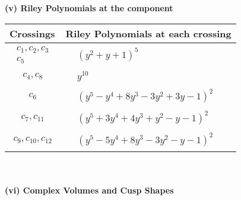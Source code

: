 \documentclass[1p]{elsarticle_modified}
\theoremstyle{definition}
\begin{document}
\newpage\renewcommand{\arraystretch}{1}
\flushleft \textbf{(v) Riley Polynomials at the component}\newline \\
\begin{tabular}{m{50pt}|m{274pt}}
Crossings & \hspace{64pt}Riley Polynomials at each crossing \\
\hline $$\begin{aligned}c_{1},c_{2},c_{3}\\c_{5}\end{aligned}$$&$\begin{aligned}
&(y^2+y+1)^5
\end{aligned}$\\
\hline $$\begin{aligned}c_{4},c_{8}\end{aligned}$$&$\begin{aligned}
&y^{10}
\end{aligned}$\\
\hline $$\begin{aligned}c_{6}\end{aligned}$$&$\begin{aligned}
&(y^5- y^4+8 y^3-3 y^2+3 y-1)^2
\end{aligned}$\\
\hline $$\begin{aligned}c_{7},c_{11}\end{aligned}$$&$\begin{aligned}
&(y^5+3 y^4+4 y^3+y^2- y-1)^2
\end{aligned}$\\
\hline $$\begin{aligned}c_{9},c_{10},c_{12}\end{aligned}$$&$\begin{aligned}
&(y^5-5 y^4+8 y^3-3 y^2- y-1)^2
\end{aligned}$\\
\hline
\end{tabular}\\~\\
\newpage\flushleft \textbf{(vi) Complex Volumes and Cusp Shapes}
\end{document}
